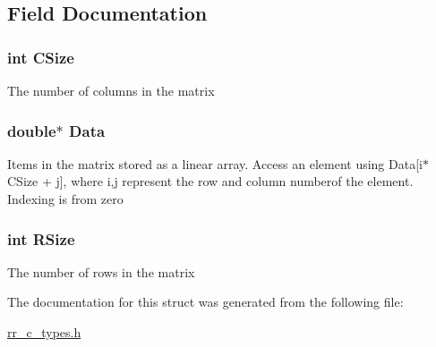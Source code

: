 \subsection{\-Field \-Documentation}
\hypertarget{struct_r_r_matrix_a17c9a5894aa9cb3789346dcaa9c370bb}{
\subsubsection[{\-C\-Size}]{\setlength{\rightskip}{0pt plus 5cm}int {\bf \-C\-Size}}}
\label{struct_r_r_matrix_a17c9a5894aa9cb3789346dcaa9c370bb}
\-The number of columns in the matrix \hypertarget{struct_r_r_matrix_a7c5cbda3aa940f4b0d6e8a1679307dfc}{
\subsubsection[{\-Data}]{\setlength{\rightskip}{0pt plus 5cm}double$\ast$ {\bf \-Data}}}
\label{struct_r_r_matrix_a7c5cbda3aa940f4b0d6e8a1679307dfc}
\-Items in the matrix stored as a linear array. \-Access an element using \-Data\mbox{[}i$\ast$\-C\-Size + j\mbox{]}, where i,j represent the row and column numberof the element. \-Indexing is from zero \hypertarget{struct_r_r_matrix_a4d8512c879223c0e0d1522dae38e7819}{
\subsubsection[{\-R\-Size}]{\setlength{\rightskip}{0pt plus 5cm}int {\bf \-R\-Size}}}
\label{struct_r_r_matrix_a4d8512c879223c0e0d1522dae38e7819}
\-The number of rows in the matrix 

\-The documentation for this struct was generated from the following file\-:\begin{DoxyCompactItemize}
\item 
\hyperlink{rr__c__types_8h}{rr\-\_\-c\-\_\-types.\-h}\end{DoxyCompactItemize}
